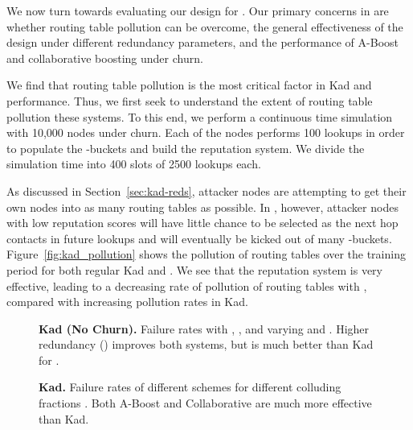 We now turn towards evaluating our design for \ksys. Our primary
concerns in \ksys are whether routing table pollution can be overcome,
the general effectiveness of the design under different redundancy
parameters, and the performance of A-Boost and collaborative boosting
under churn.

 We find that routing table
pollution is the most critical factor in Kad and \ksys
performance. Thus, we first seek to understand the extent of routing
table pollution these systems. To this end, we perform a continuous time
simulation with 10,000 nodes under  churn. Each of the nodes
performs 100 lookups in order to populate the -buckets and build the
reputation system. We divide the simulation time into 400 slots of 2500
lookups each.


As discussed in Section~\ref{sec:kad-reds}, attacker nodes are
attempting to get their own nodes into as many routing tables as
possible. In \ksys, however, attacker nodes with low reputation scores
will have little chance to be selected as the next hop contacts in
future lookups and will eventually be kicked out of many
-buckets. Figure~\ref{fig:kad_pollution} shows the pollution of
routing tables over the training period for both regular Kad and
\ksys. We see that the reputation system is very effective, leading to a
decreasing rate of pollution of routing tables with \ksys, compared with
increasing pollution rates in Kad.

\begin{figure}[t!]
\centering
\caption{{\bf Kad (No Churn).} Failure rates with , , and
   varying  and . Higher redundancy () improves both
   systems, but \ksys is much better than Kad for .}
      \label{fig:kad_f_graphs}
\end{figure}

\begin{figure}[t!]
\centering
\caption{{\bf Kad.} Failure rates of different \ksys schemes for
   different colluding fractions . Both A-Boost and Collaborative are
   much more effective than Kad.}
      \label{fig:kad_churn_graphs}
\end{figure}




